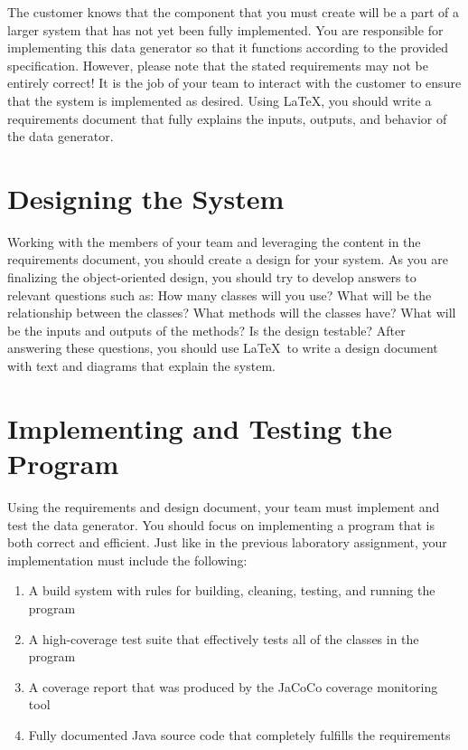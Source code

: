 The customer knows that the component that you must create will be a part of a larger system that has not yet been
fully implemented.  You are responsible for implementing this data generator so that it functions according to the
provided specification.  However, please note that the stated requirements may not be entirely correct!  It is the job
of your team to interact with the customer to ensure that the system is implemented as desired.  Using \LaTeX, you
should write a requirements document that fully explains the inputs, outputs, and behavior of the data generator.

\section*{Designing the System}

Working with the members of your team and leveraging the content in the requirements document, you should create a
design for your system.  As you are finalizing the object-oriented design, you should try to develop answers to relevant
questions such as: How many classes will you use? What will be the relationship between the classes? What methods will
the classes have? What will be the inputs and outputs of the methods?  Is the design testable?  After answering these
questions, you should use \LaTeX\  to write a design document with text and diagrams that explain the system.

\section*{Implementing and Testing the Program}

Using the requirements and design document, your team must implement and test the data generator. You should focus on
implementing a program that is both correct and efficient. Just like in the previous laboratory assignment, your
implementation must include the following:

\begin{enumerate}
	\item A build system with rules for building, cleaning, testing, and running the program
	\item A high-coverage test suite that effectively tests all of the classes in the program
	\item A coverage report that was produced by the JaCoCo coverage monitoring tool
	\item Fully documented Java source code that completely fulfills the requirements
\end{enumerate}

